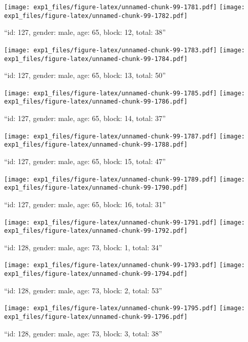 \documentclass[,]{article}
\begin{document}
\texttt{[image: exp1\_files/figure-latex/unnamed-chunk-99-1781.pdf]}
\texttt{[image: exp1\_files/figure-latex/unnamed-chunk-99-1782.pdf]}

\newpage
[1] 

``id: 127, gender: male, age: 65, block: 12, total: 38''

\texttt{[image: exp1\_files/figure-latex/unnamed-chunk-99-1783.pdf]}
\texttt{[image: exp1\_files/figure-latex/unnamed-chunk-99-1784.pdf]}

\newpage
[1] 

``id: 127, gender: male, age: 65, block: 13, total: 50''

\texttt{[image: exp1\_files/figure-latex/unnamed-chunk-99-1785.pdf]}
\texttt{[image: exp1\_files/figure-latex/unnamed-chunk-99-1786.pdf]}

\newpage
[1] 

``id: 127, gender: male, age: 65, block: 14, total: 37''

\texttt{[image: exp1\_files/figure-latex/unnamed-chunk-99-1787.pdf]}
\texttt{[image: exp1\_files/figure-latex/unnamed-chunk-99-1788.pdf]}

\newpage
[1] 

``id: 127, gender: male, age: 65, block: 15, total: 47''

\texttt{[image: exp1\_files/figure-latex/unnamed-chunk-99-1789.pdf]}
\texttt{[image: exp1\_files/figure-latex/unnamed-chunk-99-1790.pdf]}

\newpage
[1] 

``id: 127, gender: male, age: 65, block: 16, total: 31''

\texttt{[image: exp1\_files/figure-latex/unnamed-chunk-99-1791.pdf]}
\texttt{[image: exp1\_files/figure-latex/unnamed-chunk-99-1792.pdf]}

\newpage
[1] 

``id: 128, gender: male, age: 73, block: 1, total: 34''

\texttt{[image: exp1\_files/figure-latex/unnamed-chunk-99-1793.pdf]}
\texttt{[image: exp1\_files/figure-latex/unnamed-chunk-99-1794.pdf]}

\newpage
[1] 

``id: 128, gender: male, age: 73, block: 2, total: 53''

\texttt{[image: exp1\_files/figure-latex/unnamed-chunk-99-1795.pdf]}
\texttt{[image: exp1\_files/figure-latex/unnamed-chunk-99-1796.pdf]}

\newpage
[1] 

``id: 128, gender: male, age: 73, block: 3, total: 38''
\end{document}
